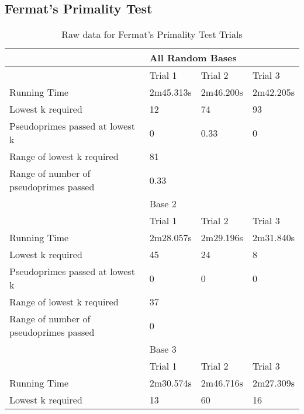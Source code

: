 \documentclass{article}
\begin{document}
\begin{appendices}
\subsection{Fermat's Primality Test}
\FloatBarrier
\begin{table}[h]
\caption{Raw data for Fermat's Primality Test Trials}
\label{table:fermat}
\begin{tabular}{@{}llll@{}}
\toprule
                                       & \multicolumn{3}{l}{All Random Bases}  \\ \midrule
                                       & Trial 1     & Trial 2    & Trial 3    \\
Running Time                           & 2m45.313s   & 2m46.200s  & 2m42.205s  \\
Lowest k required                      & 12          & 74         & 93         \\
Pseudoprimes passed at lowest k        & 0           & 0.33       & 0          \\\cmidrule(lr){2-4}
Range of lowest k required             & \multicolumn{3}{l}{81}                \\
Range of number of pseudoprimes passed & \multicolumn{3}{l}{0.33}              \\\midrule
                                       & \multicolumn{3}{l}{Base 2}            \\\midrule
                                       & Trial 1     & Trial 2    & Trial 3    \\
Running Time                           & 2m28.057s   & 2m29.196s  & 2m31.840s  \\
Lowest k required                      & 45          & 24         & 8          \\
Pseudoprimes passed at lowest k        & 0           & 0          & 0          \\\cmidrule(lr){2-4}
Range of lowest k required             & \multicolumn{3}{l}{37}                \\
Range of number of pseudoprimes passed & \multicolumn{3}{l}{0}                 \\\midrule
                                       & \multicolumn{3}{l}{Base 3}            \\\midrule
                                       & Trial 1     & Trial 2    & Trial 3    \\
Running Time                           & 2m30.574s   & 2m46.716s  & 2m27.309s  \\
Lowest k required                      & 13          & 60         & 16         \\

\end{tabular}
\end{table}
\end{appendices}
\end{document}
